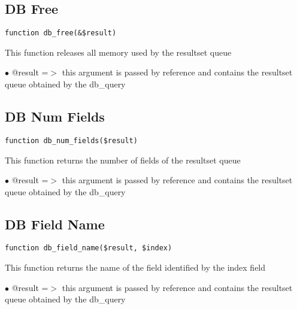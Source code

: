 \documentclass[a4paper]{book}
\begin{document}
\hypertarget{toc65}{}
\subsection{DB Free}

\begin{lstlisting}
function db_free(&$result)
\end{lstlisting}

This function releases all memory used by the resultset queue

\begin{compactitem}
\item[\color{myblue}$\bullet$] @result =$>$ this argument is passed by reference and contains the resultset queue
           obtained by the db\_query
\end{compactitem}

\hypertarget{toc66}{}
\subsection{DB Num Fields}

\begin{lstlisting}
function db_num_fields($result)
\end{lstlisting}

This function returns the number of fields of the resultset queue

\begin{compactitem}
\item[\color{myblue}$\bullet$] @result =$>$ this argument is passed by reference and contains the resultset queue
           obtained by the db\_query
\end{compactitem}

\hypertarget{toc67}{}
\subsection{DB Field Name}

\begin{lstlisting}
function db_field_name($result, $index)
\end{lstlisting}

This function returns the name of the field identified by the index field

\begin{compactitem}
\item[\color{myblue}$\bullet$] @result =$>$ this argument is passed by reference and contains the resultset queue
           obtained by the db\_query
\end{compactitem}
\end{document}
